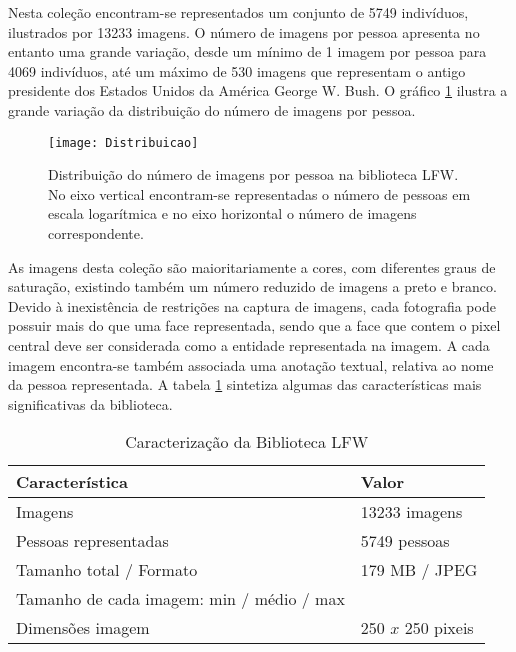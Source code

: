 Nesta coleção encontram-se representados um conjunto de 5749 indivíduos, ilustrados por 13233 imagens. O número de imagens por pessoa apresenta no entanto uma grande variação, desde um mínimo de 1 imagem por pessoa para 4069 indivíduos, até um máximo de 530 imagens que representam o antigo presidente dos Estados Unidos da América George W. Bush. O gráfico \ref{fig:distribuicaoLFW} ilustra a grande variação da distribuição do número de imagens por pessoa.

\begin{figure}[ht]
  \begin{center}
    \leavevmode
    \texttt{[image: Distribuicao]}
    \caption{Distribuição do número de imagens por pessoa na biblioteca LFW. No eixo vertical encontram-se representadas o número de pessoas em escala logarítmica e no eixo horizontal o número de imagens correspondente.}
    \label{fig:distribuicaoLFW}
  \end{center}
\end{figure}

As imagens desta coleção são maioritariamente a cores, com diferentes graus de saturação, existindo também um número reduzido de imagens a preto e branco. Devido à inexistência de restrições na captura de imagens, cada fotografia pode possuir mais do que uma face representada, sendo que a face que contem o pixel central deve ser considerada como a entidade representada na imagem. A cada imagem encontra-se também associada uma anotação textual, relativa ao nome da pessoa representada. A tabela \ref{tab:lfw} sintetiza algumas das características mais significativas da biblioteca.

\begin{center}
\begin{table}
	\caption{Caracterização da Biblioteca LFW}
	\begin{center}
    \begin{tabular}{ll}
    \hline
    Característica                            & Valor            \\ \hline
    Imagens                                   & 13233 imagens    \\
    Pessoas representadas                     & 5749 pessoas     \\
    Tamanho total / Formato                   & 179 MB / JPEG    \\
    Tamanho de cada imagem: min / médio / max & ~                \\
    Dimensões imagem                          & 250 $x$ 250 pixeis \\
    \hline
    \end{tabular}
	\label{tab:lfw}
	\end{center}
\end{table}
\end{center}

